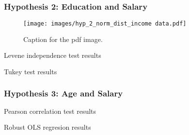 \subsubsection{Hypothesis 2: Education and Salary}

\begin{figure}[H]
    \centering
    \texttt{[image: images/hyp\_2\_norm\_dist\_income data.pdf]} %
    \caption{Caption for the pdf image.}
    \label{fig:Independence test for anova test}
\end{figure}

\begin{table}[H]
    \centering
    \caption{Levene independence test results}
    \label{tab:Levene test results}
    \begin{minipage}{\columnwidth}
        
    \end{minipage}
\end{table}

\begin{table}[H]
    \centering
    \scriptsize
    \caption{Tukey test results}
    \label{tab:tukey test results}
    \begin{minipage}{\columnwidth}
        \centering
        
    \end{minipage}
\end{table}

\subsubsection{Hypothesis 3: Age and Salary}

\begin{table}[H]
    \centering
    \caption{Pearson correlation test results}
    \label{tab:pearson correlation test results}
    \begin{minipage}{\columnwidth}
        
    \end{minipage}
\end{table}

\begin{table}[H]
    \centering
    \scriptsize
    \caption{Robust OLS regresion results}
    \label{tab:robust ols regression test results}
    \begin{minipage}{\columnwidth}
        \centering
        
    \end{minipage}
\end{table}

